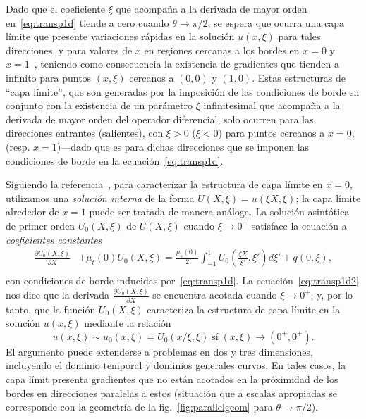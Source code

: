 Dado que el coeficiente $\xi$ que acompaña a la derivada de mayor 
orden en~\eqref{eq:transp1d} tiende a cero cuando $\theta \to \pi/2$, 
se espera que ocurra una capa límite que presente variaciones rápidas 
en la solución $u(x,\xi)$ para tales direcciones, y para valores 
de $x$ en regiones cercanas a los bordes en $x=0$ y $x=1$~\cite[Cap. 9]{Bender1999}, 
teniendo como consecuencia la existencia de gradientes que 
tienden a infinito para puntos $(x,\xi)$ cercanos a $(0,0)$ y $(1,0)$. 
Estas estructuras de ``capa límite'', que son generadas por 
la imposición de las condiciones de borde en conjunto con la existencia 
de un parámetro $\xi$ infinitesimal que acompaña a la derivada de mayor 
orden del operador diferencial, solo ocurren para las direcciones 
entrantes (salientes), con $\xi>0$ ($\xi<0$) para puntos cercanos 
a $x=0$, (resp. $x=1$)---dado que es para dichas direcciones que 
se imponen las condiciones de borde en la ecuación~\eqref{eq:transp1d}. 

Siguiendo la referencia~\cite{Bender1999}, para caracterizar
la estructura de capa límite en \eg $x=0$, utilizamos una 
{\em solución interna} de la forma $U(X,\xi) = u(\xi X,\xi)$; 
la capa límite alrededor de $x=1$ puede ser tratada de manera 
análoga. La solución asintótica de primer orden $U_0(X,\xi)$ 
de $U(X,\xi)$ cuando $\xi\to 0^+$ satisface la ecuación 
a {\em coeficientes constantes} 
\begin{equation}
\begin{split}
\frac{\partial U_0(X,\xi)}{\partial X}& + \mu_t(0) U_0(X,\xi)=\frac{\mu_s(0)}{2} 
\int_{-1}^{1} U_0\left(\frac{\xi X}{\xi'},\xi'\right) d\xi' +q(0,\xi),\\
\end{split}
\label{eq:transp1d2}
\end{equation}
con condiciones de borde inducidas por~\eqref{eq:transp1d}. 
La ecuación~\eqref{eq:transp1d2} nos dice que la derivada 
$\frac{\partial U_0(X,\xi)}{\partial X}$ se encuentra 
acotada cuando $\xi\to 0^+$, y, por lo tanto, que la función 
$U_0(X,\xi)$ caracteriza la estructura de capa límite 
en la solución $u(x,\xi)$ mediante la relación 
\begin{equation}
  u(x,\xi)\sim u_0(x,\xi) = U_0(x/\xi,\xi) \; \text{sí}  \;  (x,\xi)\to (0^+,0^+).
\end{equation}
El argumento puede extenderse a problemas en dos y tres dimensiones, 
incluyendo el dominio temporal y dominios generales curvos. En tales casos, 
la capa límit presenta gradientes que no están acotados 
en la próximidad de los bordes en direcciones paralelas a estos 
(situación que a escalas apropiadas se corresponde con la geometría 
de la fig.~\ref{fig:parallelgeom} para $\theta \to \pi/2$). 

